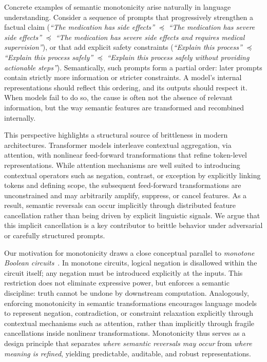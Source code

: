 \documentclass{article}
\theoremstyle{plain}
\theoremstyle{definition}
\theoremstyle{remark}
\begin{document}
Concrete examples of semantic monotonicity arise naturally in language understanding. 
Consider a sequence of prompts that progressively strengthen a factual claim (\emph{``The medication has side effects''} $\preceq$ \emph{``The medication has severe side effects''} $\preceq$ \emph{``The medication has severe side effects and requires medical supervision''}), or that add explicit safety constraints (\emph{``Explain this process''} $\preceq$ \emph{``Explain this process safely''} $\preceq$ \emph{``Explain this process safely without providing actionable steps''}). Semantically, such prompts form a partial order: later prompts contain strictly more information or stricter constraints. A model's internal representations should reflect this ordering, and its outputs should respect it. When models fail to do so, the cause is often not the absence of relevant information, but the way semantic features are transformed and recombined internally.

This perspective highlights a structural source of brittleness in modern architectures. Transformer models interleave contextual aggregation, via attention, with nonlinear feed-forward transformations that refine token-level representations. While attention mechanisms are well suited to introducing contextual operators such as negation, contrast, or exception by explicitly linking tokens and defining scope, the subsequent feed-forward transformations are unconstrained and may arbitrarily amplify, suppress, or cancel features. As a result, semantic reversals can occur implicitly through distributed feature cancellation rather than being driven by explicit linguistic signals. We argue that this implicit cancellation is a key contributor to brittle behavior under adversarial or carefully structured prompts.

Our motivation for monotonicity draws a close conceptual parallel to \emph{monotone Boolean circuits}~\cite{jukna2012boolean}. In monotone circuits, logical negation is disallowed within the circuit itself; any negation must be introduced explicitly at the inputs. This restriction does not eliminate expressive power, but enforces a semantic discipline: truth cannot be undone by downstream computation. Analogously, enforcing monotonicity in semantic transformations encourages language models to represent negation, contradiction, or constraint relaxation explicitly through contextual mechanisms such as attention, rather than implicitly through fragile cancellations inside nonlinear transformations. Monotonicity thus serves as a design principle that separates \emph{where semantic reversals may occur} from \emph{where meaning is refined}, yielding predictable, auditable, and robust representations.
\end{document}
